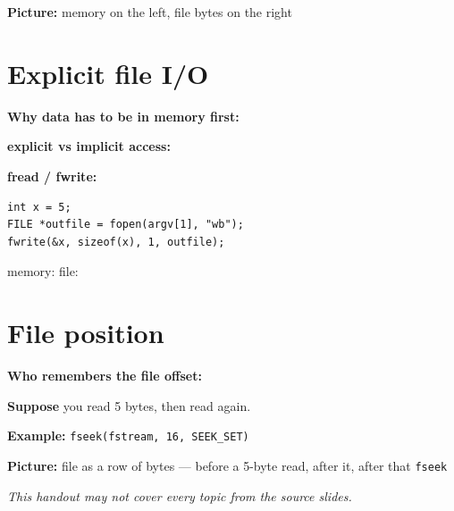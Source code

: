 \documentclass[12pt]{article}
\begin{document}
\newpage
\Needspace{0.55\textheight}
\noindent\textbf{Picture:} memory on the left, file bytes on the right
\begin{framed}
\begin{minipage}[t][0.44\textheight]{\textwidth}
\vspace{0.4em}
\end{minipage}
\end{framed}

\newpage
\section*{Explicit file I/O}

\Needspace{0.24\textheight}
\noindent\textbf{Why data has to be in memory first:}
\vspace{0.14\textheight}

\Needspace{0.32\textheight}
\noindent\textbf{explicit vs implicit access:}
\vspace{0.22\textheight}

\Needspace{0.36\textheight}
\noindent\textbf{fread / fwrite:}
\vspace{0.22\textheight}

\begin{lstlisting}
int x = 5;
FILE *outfile = fopen(argv[1], "wb");
fwrite(&x, sizeof(x), 1, outfile);
\end{lstlisting}
\noindent memory: \hspace{8em} file:
\vspace{0.12\textheight}

\newpage
\section*{File position}

\Needspace{0.32\textheight}
\noindent\textbf{Who remembers the file offset:}
\vspace{0.22\textheight}

\Needspace{0.24\textheight}
\noindent\textbf{Suppose} you read 5 bytes, then read again.
\vspace{0.14\textheight}

\Needspace{0.20\textheight}
\noindent\textbf{Example:} \texttt{fseek(fstream, 16, SEEK\_SET)}
\vspace{0.12\textheight}

\newpage
\Needspace{0.55\textheight}
\noindent\textbf{Picture:} file as a row of bytes --- before a 5-byte read, after it, after that \texttt{fseek}
\begin{framed}
\begin{minipage}[t][0.44\textheight]{\textwidth}
\vspace{0.4em}
\end{minipage}
\end{framed}

\vspace{2em}
\begin{center}
\textit{This handout may not cover every topic from the source slides.}
\end{center}
\end{document}
